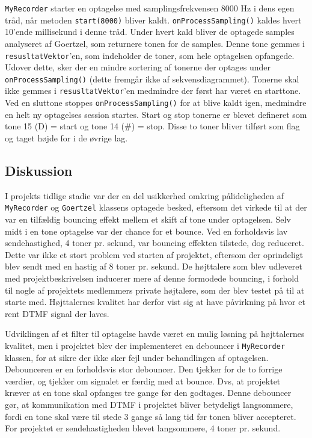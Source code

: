 \texttt{MyRecorder} starter en optagelse med samplingsfrekvensen 8000 Hz i dens egen tråd, når metoden \texttt{start(8000)} bliver kaldt. \texttt{onProcessSampling()} kaldes hvert 10’ende millisekund i denne tråd. Under hvert kald bliver de optagede samples analyseret af Goertzel, som returnere tonen for de samples. Denne tone gemmes i \texttt{resusltatVektor}’en, som indeholder de toner, som hele optagelsen opfangede. Udover dette, sker der en mindre sortering af tonerne der optages under \texttt{onProcessSampling()} (dette fremgår ikke af sekvensdiagrammet). Tonerne skal ikke gemmes i \texttt{resusltatVektor}’en medmindre der først har været en starttone. Ved en sluttone stoppes \texttt{onProcessSampling()} for at blive kaldt igen, medmindre en helt ny optagelses session startes. Start og stop tonerne er blevet  defineret som tone 15 (D) = start og tone 14 (\#) = stop. Disse to toner bliver tilført som flag og taget højde for i de øvrige lag.

\subsection{Diskussion}
I projekts tidlige stadie var der en del usikkerhed omkring pålideligheden af \texttt{MyRecorder} og \texttt{Goertzel} klassens optagede besked, eftersom det virkede til at der var en tilfældig bouncing effekt mellem et skift af tone under optagelsen. Selv midt i en tone optagelse var der chance for et bounce. Ved en forholdsvis lav sendehastighed, 4 toner pr. sekund, var bouncing effekten tilstede, dog reduceret.
\newline
Dette var ikke et stort problem ved starten af projektet, eftersom der oprindeligt blev sendt med en hastig af 8 toner pr. sekund. De højttalere som blev udleveret med projektbeskrivelsen inducerer mere af denne formodede bouncing, i forhold til nogle af projektets medlemmers private højtalere, som der blev testet på til at starte med.
\newline
Højttalernes kvalitet har derfor vist sig at have påvirkning på hvor et rent DTMF signal der laves.
\hfill \break

Udviklingen af et filter til optagelse havde været en mulig løsning på højttalernes kvalitet, men i projektet blev der implementeret en debouncer i \texttt{MyRecorder} klassen, for at sikre der ikke sker fejl under behandlingen af optagelsen. Debounceren er en forholdsvis stor debouncer. Den tjekker for de to forrige værdier, og tjekker om signalet er færdig med at bounce. Dvs, at projektet kræver at en tone skal opfanges tre gange før den godtages. Denne debouncer gør, at kommunikation med DTMF i projektet bliver betydeligt langsommere, fordi en tone skal være til stede 3 gange så lang tid før tonen bliver accepteret. For projektet er sendehastigheden blevet langsommere, 4 toner pr. sekund.
\hfill \break


